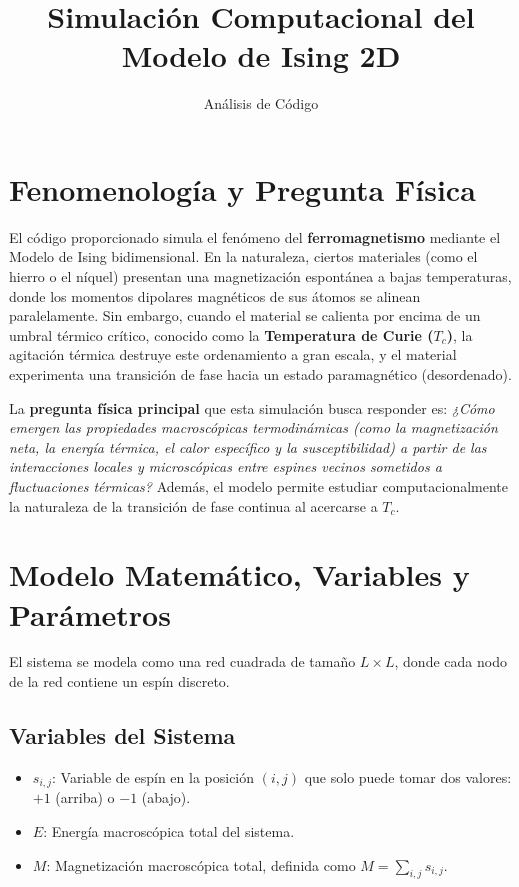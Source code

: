 \documentclass[11pt, a4paper]{article}
\title{\textbf{Simulación Computacional del Modelo de Ising 2D}}
\author{Análisis de Código}
\date{}
\begin{document}
\maketitle

\section{Fenomenología y Pregunta Física}
El código proporcionado simula el fenómeno del \textbf{ferromagnetismo} mediante el Modelo de Ising bidimensional. En la naturaleza, ciertos materiales (como el hierro o el níquel) presentan una magnetización espontánea a bajas temperaturas, donde los momentos dipolares magnéticos de sus átomos se alinean paralelamente. Sin embargo, cuando el material se calienta por encima de un umbral térmico crítico, conocido como la \textbf{Temperatura de Curie ($T_c$)}, la agitación térmica destruye este ordenamiento a gran escala, y el material experimenta una transición de fase hacia un estado paramagnético (desordenado).

La \textbf{pregunta física principal} que esta simulación busca responder es: \textit{¿Cómo emergen las propiedades macroscópicas termodinámicas (como la magnetización neta, la energía térmica, el calor específico y la susceptibilidad) a partir de las interacciones locales y microscópicas entre espines vecinos sometidos a fluctuaciones térmicas?} Además, el modelo permite estudiar computacionalmente la naturaleza de la transición de fase continua al acercarse a $T_c$.

\section{Modelo Matemático, Variables y Parámetros}
El sistema se modela como una red cuadrada de tamaño $L \times L$, donde cada nodo de la red contiene un espín discreto. 

\subsection*{Variables del Sistema}
\begin{itemize}
    \item $s_{i,j}$: Variable de espín en la posición $(i,j)$ que solo puede tomar dos valores: $+1$ (arriba) o $-1$ (abajo).
    \item $E$: Energía macroscópica total del sistema.
    \item $M$: Magnetización macroscópica total, definida como $M = \sum_{i,j} s_{i,j}$.
\end{itemize}
\end{document}
